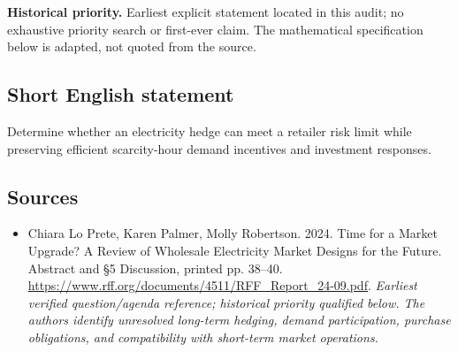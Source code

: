 \documentclass[11pt]{article}
\begin{document}
\par\textbf{Historical priority.} Earliest explicit statement located in this audit; no exhaustive priority search or first-ever claim. The mathematical specification below is adapted, not quoted from the source.

\subsection{Short English statement}
Determine whether an electricity hedge can meet a retailer risk limit while preserving efficient scarcity-hour demand incentives and investment responses.

\subsection{Sources}
\begin{itemize}\raggedright
\item[\textnormal{[S1]}]\hypertarget{source:30007720:1}{} Chiara Lo Prete, Karen Palmer, Molly Robertson. 2024. Time for a Market Upgrade? A Review of Wholesale Electricity Market Designs for the Future. Abstract and §5 Discussion, printed pp. 38–40.
\url{https://www.rff.org/documents/4511/RFF_Report_24-09.pdf}.
{\small\textit{Earliest verified question/agenda reference; historical priority qualified below. The authors identify unresolved long-term hedging, demand participation, purchase obligations, and compatibility with short-term market operations.}}
\end{itemize}
\end{document}
